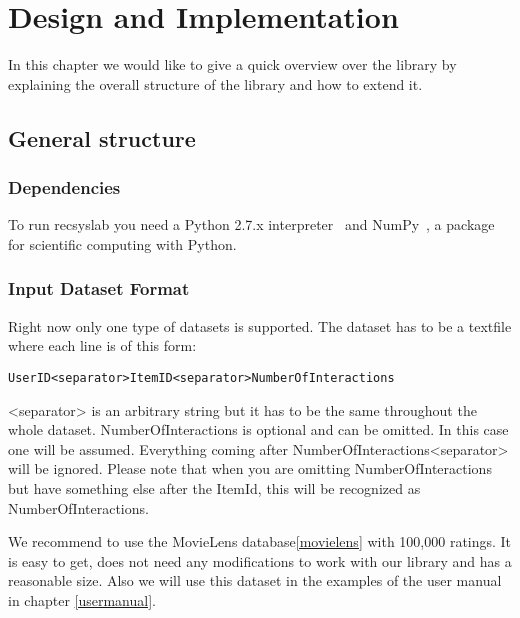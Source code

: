
\chapter{Design and Implementation}
\label{design}
In this chapter we would like to give a quick overview over the library
by explaining the overall structure of the library and how to extend it.


\section{General structure}
\subsection*{Dependencies}
To run recsyslab you need a Python 2.7.x interpreter~\cite{python} and NumPy~\cite{numpy},
a package for scientific computing with Python.

\subsection*{Input Dataset Format}
Right now only one type of datasets is supported. The dataset has to be
a textfile where each line is of this form:
\begin{lstlisting}
UserID<separator>ItemID<separator>NumberOfInteractions
\end{lstlisting}
<separator> is an arbitrary string but it has to be the same throughout the whole dataset.
NumberOfInteractions is optional and can be omitted. In this case one will be assumed.
Everything coming after NumberOfInteractions<separator> will be ignored.
Please note that when you are omitting NumberOfInteractions but have something else after
the ItemId, this will be recognized as NumberOfInteractions.

We recommend to use the MovieLens database\ref{movielens} with 100,000 ratings.
It is easy to get, does not need any modifications to work with our library and has a
reasonable size. Also we will use this dataset in the examples of the user manual in 
chapter \ref{usermanual}.



